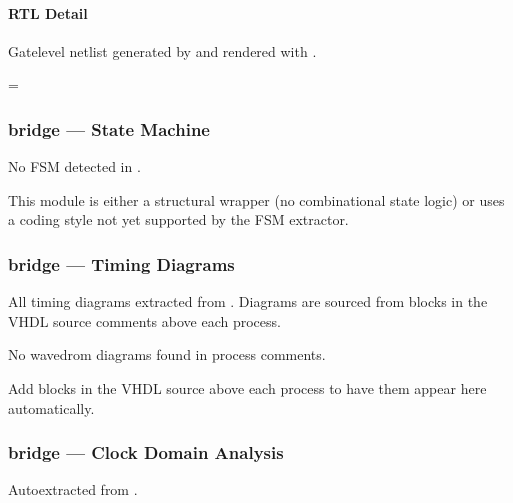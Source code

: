 \documentclass[letterpaper,10pt,english]{sphinxmanual}
\begin{document}
\paragraph{RTL Detail}
\label{\detokenize{modules/bridge/block:rtl-detail}}
\sphinxAtStartPar
Gate\sphinxhyphen{}level netlist generated by  and rendered with .

\begin{landscape}
\makeatletter
\spx@image@maxheight=\dimexpr{}\baselineskip\relax
\makeatother


\end{landscape}

\sphinxstepscope


\subsubsection{bridge — State Machine}
\label{\detokenize{modules/bridge/fsm:bridge-state-machine}}\label{\detokenize{modules/bridge/fsm::doc}}
\sphinxAtStartPar
No FSM detected in .

\sphinxAtStartPar
This module is either a structural wrapper (no combinational
state logic) or uses a coding style not yet supported by the
FSM extractor.

\sphinxstepscope


\subsubsection{bridge — Timing Diagrams}
\label{\detokenize{modules/bridge/timing:bridge-timing-diagrams}}\label{\detokenize{modules/bridge/timing::doc}}
\sphinxAtStartPar
All timing diagrams extracted from .
Diagrams are sourced from  blocks in the VHDL
source comments above each process.

\sphinxAtStartPar
No wavedrom diagrams found in process comments.

\sphinxAtStartPar
Add  blocks in the VHDL source above each
process to have them appear here automatically.

\sphinxstepscope


\subsubsection{bridge — Clock Domain Analysis}
\label{\detokenize{modules/bridge/cdc:bridge-clock-domain-analysis}}\label{\detokenize{modules/bridge/cdc::doc}}
\sphinxAtStartPar
Auto\sphinxhyphen{}extracted from .
\end{document}
